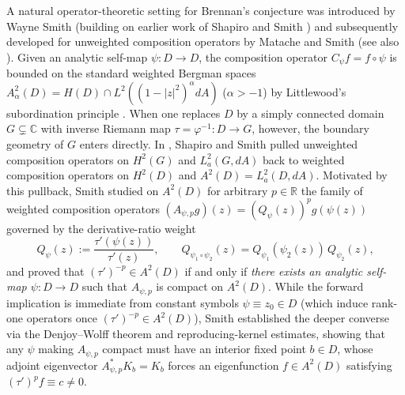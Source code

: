 \documentclass[12pt]{article}
\def\R{\mathbb{R}}
\def\C{\mathbb{C}}
\theoremstyle{definition}
\numberwithin{equation}{section}
\begin{document}
A natural operator-theoretic setting for Brennan's conjecture was introduced by Wayne Smith \cite{Smi06} (building on earlier work of Shapiro and Smith \cite{SS03}) and subsequently developed for unweighted composition operators by Matache and Smith \cite{MS12} (see also \cite{Mat08}). Given an analytic self-map $\psi : D \to D$, the composition operator $C_\psi f = f \circ \psi$ is bounded on the standard weighted Bergman spaces $A^2_\alpha(D) = H(D) \cap L^2((1-|z|^2)^\alpha dA)$ ($\alpha > -1$) by Littlewood's subordination principle \cite{CM95, Sha93, Zhu07}. When one replaces $D$ by a simply connected domain $G \subsetneq \C$ with inverse Riemann map $\tau = \varphi^{-1} : D \to G$, however, the boundary geometry of $G$ enters directly. In \cite{SS03}, Shapiro and Smith pulled unweighted composition operators on $H^2(G)$ and $L^2_a(G, dA)$ back to weighted composition operators on $H^2(D)$ and $A^2(D) = L^2_a(D, dA)$. Motivated by this pullback, Smith \cite{Smi06} studied on $A^2(D)$ for arbitrary $p \in \R$ the family of weighted composition operators $(A_{\psi, p} g)(z) = (Q_\psi(z))^p g(\psi(z))$ governed by the derivative-ratio weight
\begin{equation}\label{eq:smith-cocycle-intro}
  Q_\psi(z) := \frac{\tau'(\psi(z))}{\tau'(z)}, \qquad Q_{\psi_1 \circ \psi_2}(z) = Q_{\psi_1}(\psi_2(z))\, Q_{\psi_2}(z),
\end{equation}
and proved \cite[Theorem~1.1]{Smi06} that $(\tau')^{-p} \in A^2(D)$ if and only if \emph{there exists an analytic self-map $\psi : D \to D$} such that $A_{\psi, p}$ is compact on $A^2(D)$. While the forward implication is immediate from constant symbols $\psi \equiv z_0 \in D$ (which induce rank-one operators once $(\tau')^{-p} \in A^2(D)$), Smith established the deeper converse via the Denjoy--Wolff theorem and reproducing-kernel estimates, showing that any $\psi$ making $A_{\psi, p}$ compact must have an interior fixed point $b \in D$, whose adjoint eigenvector $A_{\psi, p}^* K_b = K_b$ forces an eigenfunction $f \in A^2(D)$ satisfying $(\tau')^p f \equiv c \ne 0$.
\end{document}
